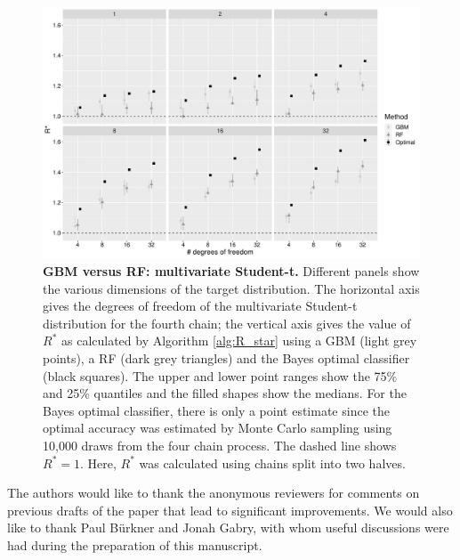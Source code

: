 \documentclass[ba]{imsart}
\numberwithin{equation}{section}
\theoremstyle{plain}
\begin{document}
\begin{supplement}
		
		\begin{figure}[!htb]
			\centerline{\includegraphics[width=1\textwidth]{gbm_vs_rf_studentt.pdf}}
			\caption{\textbf{GBM versus RF: multivariate Student-t.} Different panels show the various dimensions of the target distribution. The horizontal axis gives the degrees of freedom of the multivariate Student-t distribution for the fourth chain; the vertical axis gives the value of $R^*$ as calculated by Algorithm \ref{alg:R_star} using a GBM (light grey points), a RF (dark grey triangles) and the Bayes optimal classifier (black squares). The upper and lower point ranges show the 75\% and 25\% quantiles and the filled shapes show the medians. For the Bayes optimal classifier, there is only a point estimate since the optimal accuracy was estimated by Monte Carlo sampling using 10,000 draws from the four chain process. The dashed line shows $R^*=1$. Here, $R^*$ was calculated using chains split into two halves.}
			\label{fig:gbm_vs_rf_studdentt}
		\end{figure}
		
		
	\end{supplement}

	
	
	
	
	\begin{acknowledgement}
		The authors would like to thank the anonymous reviewers for comments on previous drafts of the paper that lead to significant improvements. We would also like to thank Paul B{\"u}rkner and Jonah Gabry, with whom useful discussions were had during the preparation of this manuscript.
	\end{acknowledgement}
	
	
\end{document}
